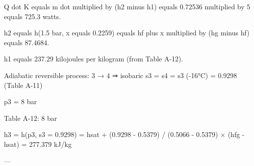 Q dot K equals m dot multiplied by (h2 minus h1) equals 0.72536 multiplied by 5 equals 725.3 watts.  

h2 equals h(1.5 bar, x equals 0.2259) equals hf plus x multiplied by (hg minus hf) equals 87.4684.  

h1 equals 237.29 kilojoules per kilogram (from Table A-12).

Adiabatic reversible process: 3 → 4 ⇒ isobaric  
s3 = s4 = s3 (-16°C) = 0.9298 (Table A-11)  

p3 = 8 bar  

Table A-12: 8 bar  

h3 = h(p3, s3 = 0.9298) = hsat + (0.9298 - 0.5379) / (0.5066 - 0.5379) × (hfg - hsat) = 277.379 kJ/kg  

---